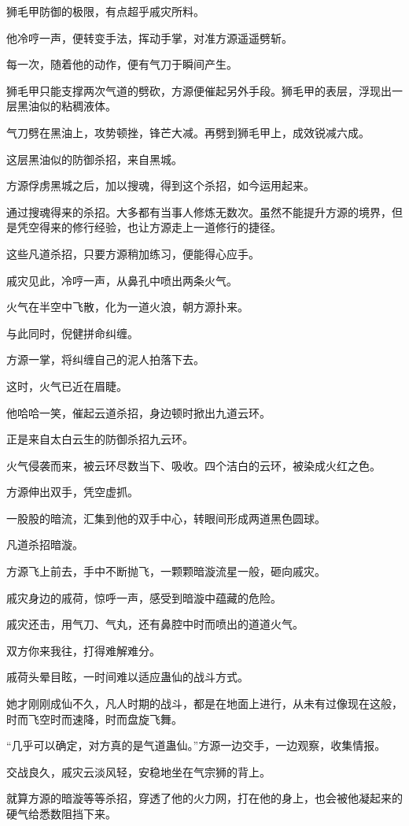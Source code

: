 \begin{this_body}
狮毛甲防御的极限，有点超乎戚灾所料。

他冷哼一声，便转变手法，挥动手掌，对准方源遥遥劈斩。

每一次，随着他的动作，便有气刀于瞬间产生。

狮毛甲只能支撑两次气道的劈砍，方源便催起另外手段。狮毛甲的表层，浮现出一层黑油似的粘稠液体。

气刀劈在黑油上，攻势顿挫，锋芒大减。再劈到狮毛甲上，成效锐减六成。

这层黑油似的防御杀招，来自黑城。

方源俘虏黑城之后，加以搜魂，得到这个杀招，如今运用起来。

通过搜魂得来的杀招。大多都有当事人修炼无数次。虽然不能提升方源的境界，但是凭空得来的修行经验，也让方源走上一道修行的捷径。

这些凡道杀招，只要方源稍加练习，便能得心应手。

戚灾见此，冷哼一声，从鼻孔中喷出两条火气。

火气在半空中飞散，化为一道火浪，朝方源扑来。

与此同时，倪健拼命纠缠。

方源一掌，将纠缠自己的泥人拍落下去。

这时，火气已近在眉睫。

他哈哈一笑，催起云道杀招，身边顿时掀出九道云环。

正是来自太白云生的防御杀招九云环。

火气侵袭而来，被云环尽数当下、吸收。四个洁白的云环，被染成火红之色。

方源伸出双手，凭空虚抓。

一股股的暗流，汇集到他的双手中心，转眼间形成两道黑色圆球。

凡道杀招暗漩。

方源飞上前去，手中不断抛飞，一颗颗暗漩流星一般，砸向戚灾。

戚灾身边的戚荷，惊呼一声，感受到暗漩中蕴藏的危险。

戚灾还击，用气刀、气丸，还有鼻腔中时而喷出的道道火气。

双方你来我往，打得难解难分。

戚荷头晕目眩，一时间难以适应蛊仙的战斗方式。

她才刚刚成仙不久，凡人时期的战斗，都是在地面上进行，从未有过像现在这般，时而飞空时而速降，时而盘旋飞舞。

“几乎可以确定，对方真的是气道蛊仙。”方源一边交手，一边观察，收集情报。

交战良久，戚灾云淡风轻，安稳地坐在气宗狮的背上。

就算方源的暗漩等等杀招，穿透了他的火力网，打在他的身上，也会被他凝起来的硬气给悉数阻挡下来。


\end{this_body}
